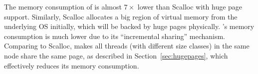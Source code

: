 The memory consumption of \NM{} is almost $7\times$ lower than Scalloc with huge page support. Similarly, Scalloc allocates a big region of virtual memory from the underlying OS initially, which will be backed by huge pages physically. \NM{}'s memory consumption is much lower due to its ``incremental sharing'' mechanism. Comparing to Scalloc, \NM{} makes all threads (with different size classes) in the same node share the same 
page, as described in Section~\ref{sec:hugepages}, which effectively reduces its memory consumption. 


 
 
